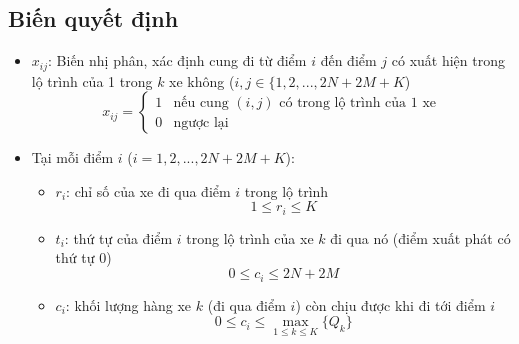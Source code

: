 \documentclass[3p,12pt]{article}
\begin{document}
	\subsection{Biến quyết định}
		\begin{itemize}
			\item $x_{ij}$: Biến nhị phân, xác định cung đi từ điểm $i$ đến điểm $j$ có xuất hiện trong lộ trình của 1 trong $k$ xe không ($i,j\in \{1,2,...,2N+2M+K$)
			\begin{equation}
				x_{ij} = 
				\begin{cases}
				1 & \text{nếu cung $(i,j)$ có trong lộ trình của 1 xe}\\
				0 & \text{ngược lại}
				\end{cases}
			\end{equation}
			\item Tại mỗi điểm $i$ ($i=1,2,...,2N+2M+K$):
			\begin{itemize}
				\item $r_i$: chỉ số của xe đi qua điểm $i$ trong lộ trình
				\begin{equation}
					1\leq r_i\leq K
				\end{equation}
				\item $t_i$: thứ tự của điểm $i$ trong lộ trình của xe $k$ đi qua nó (điểm xuất phát có thứ tự 0)
				\begin{equation}
					0\leq c_i\leq 2N+2M
				\end{equation}
				\item $c_i$: khối lượng hàng xe $k$ (đi qua điểm $i$) còn chịu được khi đi tới điểm $i$
				\begin{equation}
					0\leq c_i\leq \max _{1\leq k\leq K} \{Q_k\}
				\end{equation}
			\end{itemize}
		\end{itemize}
	
\end{document}
